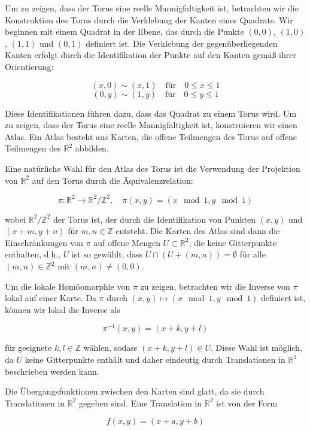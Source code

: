 Um zu zeigen, dass der Torus eine reelle Mannigfaltigkeit ist, betrachten wir die Konstruktion des Torus durch die Verklebung der Kanten eines Quadrats. Wir beginnen mit einem Quadrat in der Ebene, das durch die Punkte \( (0,0) \), \( (1,0) \), \( (1,1) \) und \( (0,1) \) definiert ist. Die Verklebung der gegenüberliegenden Kanten erfolgt durch die Identifikation der Punkte auf den Kanten gemäß ihrer Orientierung:

\[
(x,0) \sim (x,1) \quad \text{für} \quad 0 \leq x \leq 1
\]
\[
(0,y) \sim (1,y) \quad \text{für} \quad 0 \leq y \leq 1
\]

Diese Identifikationen führen dazu, dass das Quadrat zu einem Torus wird. Um zu zeigen, dass der Torus eine reelle Mannigfaltigkeit ist, konstruieren wir einen Atlas. Ein Atlas besteht aus Karten, die offene Teilmengen des Torus auf offene Teilmengen des \(\mathbb{R}^2\) abbilden.

Eine natürliche Wahl für den Atlas des Torus ist die Verwendung der Projektion von \(\mathbb{R}^2\) auf den Torus durch die Äquivalenzrelation:

\[
\pi: \mathbb{R}^2 \to \mathbb{R}^2 / \mathbb{Z}^2, \quad \pi(x,y) = (x \mod 1, y \mod 1)
\]

wobei \(\mathbb{R}^2 / \mathbb{Z}^2\) der Torus ist, der durch die Identifikation von Punkten \((x,y)\) und \((x+m, y+n)\) für \(m, n \in \mathbb{Z}\) entsteht. Die Karten des Atlas sind dann die Einschränkungen von \(\pi\) auf offene Mengen \(U \subset \mathbb{R}^2\), die keine Gitterpunkte enthalten, d.h., \(U\) ist so gewählt, dass \(U \cap (U + (m,n)) = \emptyset\) für alle \((m,n) \in \mathbb{Z}^2\) mit \((m,n) \neq (0,0)\).

Um die lokale Homöomorphie von \(\pi\) zu zeigen, betrachten wir die Inverse von \(\pi\) lokal auf einer Karte. Da \(\pi\) durch \((x,y) \mapsto (x \mod 1, y \mod 1)\) definiert ist, können wir lokal die Inverse als

\[
\pi^{-1}(x,y) = (x+k, y+l)
\]

für geeignete \(k, l \in \mathbb{Z}\) wählen, sodass \((x+k, y+l) \in U\). Diese Wahl ist möglich, da \(U\) keine Gitterpunkte enthält und daher eindeutig durch Translationen in \(\mathbb{R}^2\) beschrieben werden kann.

Die Übergangsfunktionen zwischen den Karten sind glatt, da sie durch Translationen in \(\mathbb{R}^2\) gegeben sind. Eine Translation in \(\mathbb{R}^2\) ist von der Form

\[
f(x,y) = (x+a, y+b)
\]

